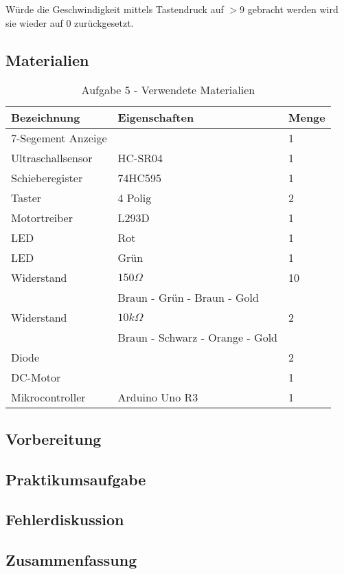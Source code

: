 Würde die Geschwindigkeit mittels Tastendruck auf $> 9$ gebracht werden wird sie wieder auf 0 zurückgesetzt.

\subsection{Materialien}
\label{subsec:a6-materialien}

\begin{table}[h]
    \centering
    \caption{Aufgabe 5 - Verwendete Materialien}
    \label{tab:a5-materialien}
    \begin{tabular}{| l | l | l |}
        \hline
        Bezeichnung & Eigenschaften & Menge \\
        \hline
        7-Segement Anzeige & & 1 \\
        Ultraschallsensor & HC-SR04 & 1 \\
        Schieberegister & 74HC595 & 1 \\
        Taster & 4 Polig & 2\\
        Motortreiber & L293D & 1 \\
        LED & Rot & 1 \\
        LED & Grün & 1 \\
        Widerstand & $150\Omega$ & 10 \\
        & Braun - Grün - Braun - Gold & \\
        Widerstand & $10k\Omega$ & 2 \\
        & Braun - Schwarz - Orange - Gold & \\
        Diode & & 2 \\
        DC-Motor & & 1 \\
        Mikrocontroller & Arduino Uno R3 & 1 \\
        \hline
    \end{tabular}
\end{table}

\subsection{Vorbereitung}
\label{subsec:a6-vorbereitung}

\subsection{Praktikumsaufgabe}
\label{subsec:a6-praktikumsaufgabe}

\subsection{Fehlerdiskussion}
\label{subsec:a6-fehlerdiskussion}

\subsection{Zusammenfassung}
\label{subsec:a6-zusammenfassung}
